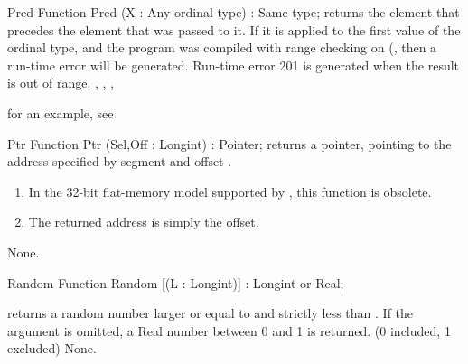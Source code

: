 \begin{function}{Pred}
\Declaration
Function Pred (X : Any ordinal type) : Same type;
\Description
  returns the element that precedes the element that was passed
to it. If it is applied to the first value of the ordinal type, and the
program was compiled with range checking on (, then a run-time
error will be generated.
\Errors
Run-time error 201 is generated when the result is out of
range.
\SeeAlso
{}, , , 
\end{function}

for an example, see 

\begin{function}{Ptr}
\Declaration
Function Ptr (Sel,Off : Longint) : Pointer;
\Description
{} returns a pointer, pointing to the address specified by
segment  and offset .

 \begin{remark}
\begin{enumerate}
\item In the 32-bit flat-memory model supported by \fpc, this
function is obsolete.
\item The returned address is simply the offset.
\end{enumerate}
\end{remark}
\Errors
None.
\SeeAlso
{}
\end{function}


\begin{function}{Random}
\Declaration
Function Random [(L : Longint)] : Longint or Real;

\Description
{} returns a random number larger or equal to  and
strictly less than .
If the argument  is omitted, a Real number between 0 and 1 is returned.
(0 included, 1 excluded)
\Errors
None.
\SeeAlso
{}
\end{function}



